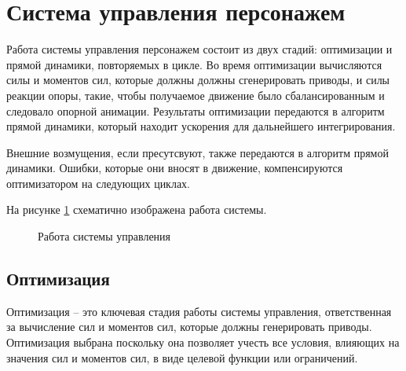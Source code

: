 \section{Система управления персонажем}

Работа системы управления персонажем состоит из двух стадий: оптимизации и прямой динамики, повторяемых в цикле. Во время оптимизации вычисляются силы и моментов сил, которые должны должны сгенерировать приводы, и силы реакции опоры, такие, чтобы получаемое движение было сбалансированным и следовало опорной анимации. Результаты оптимизации передаются в алгоритм прямой динамики, который находит ускорения для дальнейшего интегрирования.

Внешние возмущения, если пресутсвуют, также передаются в алгоритм прямой динамики. Ошибки, которые они вносят в движение, компенсируются оптимизатором на следующих циклах.

На рисунке \ref{fig:architecture} схематично изображена работа системы.

\begin{figure}[ht]
  \begin{minipage}{\textwidth}
    \centering
    \caption{Работа системы управления}
    \label{fig:architecture}
  \end{minipage}
\end{figure}

\subsection{Оптимизация}

Оптимизация -- это ключевая стадия работы системы управления, ответственная за вычисление сил и моментов сил, которые должны генерировать приводы. Оптимизация выбрана поскольку она позволяет учесть все условия, влияющих на значения сил и моментов сил, в виде целевой функции или ограничений.

